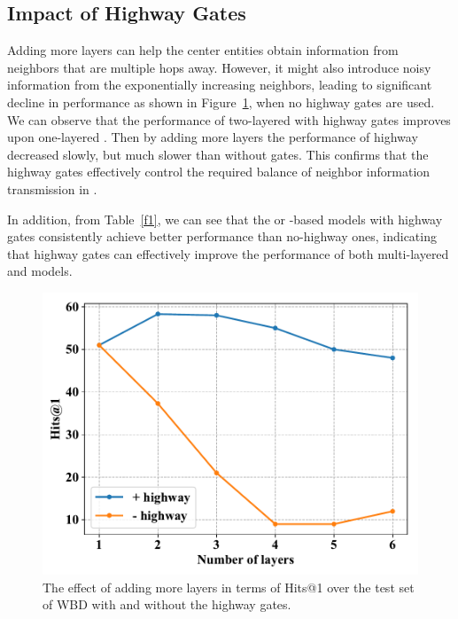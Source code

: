 \subsection{Impact of Highway Gates} Adding more \HRGCN layers can help the center entities obtain information from neighbors that are multiple hops
away. However, it might also introduce noisy information from the exponentially increasing neighbors, leading to significant decline in
performance as shown in Figure~\ref{highway}, when no highway gates are used. We can observe that the performance of two-layered \RGCNs
with highway gates improves upon one-layered \RGCN. Then by adding more layers the performance of highway \RGCNs decreased slowly, but much
slower than \RGCNs without gates. This confirms that the highway gates effectively control the required balance of neighbor information
transmission in \RGCNs.

In addition, from Table~\ref{f1}, we can see that the \GCN or \RGCN-based models with highway gates consistently achieve better performance than no-highway ones, indicating that highway gates can effectively improve the performance of both multi-layered \GCN and \RGCN models.
\begin{figure}
	\centering
	\includegraphics[width=0.8\linewidth]{figures/graph3.pdf}
	\caption{The effect of adding more \RGCN layers in terms of Hits@1 over the test set of WBD with and without the highway gates.}
	\label{highway}
\end{figure}
